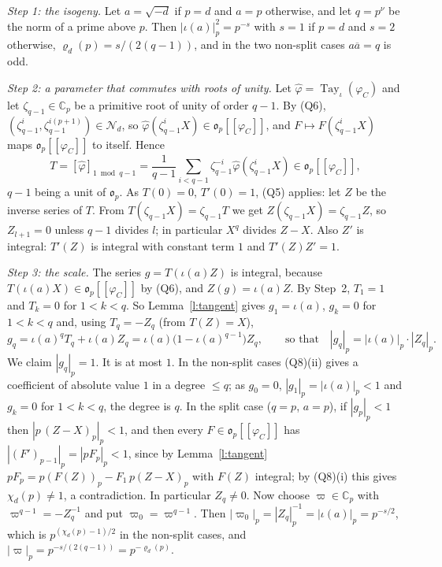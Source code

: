 \documentclass[11pt,a4paper]{article}
\makeatletter
\theoremstyle{plainx}
\theoremstyle{uprightx}
\renewenvironment{proof}[1][Proof]{\par\pushQED{\qed}\normalfont\topsep0pt\partopsep0pt
  \trivlist\item[\hskip\labelsep\itshape #1.]\ignorespaces}{\popQED\endtrivlist\@endpefalse}
\newcommand{\CC}{\mathbb{C}}
\newcommand{\Cp}{\CC_p}
\newcommand{\op}{\mathfrak{o}_p}
\newcommand{\np}[1]{|#1|_p}
\newcommand{\cj}[1]{\overline{#1}}
\newcommand{\chid}[1]{\chi_{#1}}
\newcommand{\nsw}[2]{\varrho_{#1}(#2)}
\newcommand{\phC}[1]{\varphi_{#1}}
\newcommand{\tayj}[1]{\operatorname{Tay}_\iota(#1)}
\newcommand{\phiring}[1]{\op[[\phC{#1}]]}
\newcommand{\cpart}[3]{[#3]_{#2\bmod #1}}
\makeatother
\begin{document}
\begin{proof}
\emph{Step 1: the isogeny.} Let $a=\sqrt{-d}$ if $p=d$ and $a=p$ otherwise, and let $q=p^\nu$ be the norm of a
prime above $p$. Then $\np{\iota(a)}^2=p^{-s}$ with $s=1$ if $p=d$ and $s=2$ otherwise, $\nsw{d}{p}=s/(2(q-1))$, and
in the two non-split cases $a\cj a=q$ is odd.

\emph{Step 2: a parameter that commutes with roots of unity.} Let $\hat\varphi=\tayj{\phC{C}}$ and let
$\zeta_{q-1}\in\Cp$ be a primitive root of unity of order $q-1$. By (Q6), $(\zeta_{q-1}^i,\zeta_{q-1}^{i(p+1)})\in\mathcal{N}_d$, so
$\hat\varphi(\zeta_{q-1}^iX)\in\phiring{C}$, and $F\mapsto F(\zeta_{q-1}^iX)$ maps $\phiring{C}$ to itself. Hence
\[T=\cpart{q-1}{1}{\hat\varphi}=\frac1{q-1}\sum_{i<q-1}\zeta_{q-1}^{-i}\hat\varphi(\zeta_{q-1}^iX)\in\phiring{C} ,\]
$q-1$ being a unit of $\op$. As $T(0)=0$, $T'(0)=1$, (Q5) applies: let $Z$ be the inverse series of $T$. From
$T(\zeta_{q-1} X)=\zeta_{q-1} T$ we get $Z(\zeta_{q-1} X)=\zeta_{q-1} Z$, so $Z_{l+1}=0$ unless $q-1$ divides $l$; in particular $X^q$
divides $Z-X$. Also $Z'$ is integral: $T'(Z)$ is integral with constant term $1$ and $T'(Z)Z'=1$.

\emph{Step 3: the scale.} The series
$g=T(\iota(a)Z)$ is integral, because $T(\iota(a)X)\in\phiring{C}$ by (Q6), and $Z(g)=\iota(a)Z$. By Step~2, $T_1=1$ and
$T_k=0$ for $1<k<q$. So Lemma~\ref{l:tangent} gives $g_1=\iota(a)$, $g_k=0$ for $1<k<q$ and, using $T_q=-Z_q$
(from $T(Z)=X$),
\[g_q=\iota(a)^qT_q+\iota(a)Z_q=\iota(a)\bigl(1-\iota(a)^{q-1}\bigr)Z_q,\qquad\text{so that}\quad\np{g_q}=\np{\iota(a)}\cdot\np{Z_q} .\]
We claim $\np{g_q}=1$. It is at most $1$. In the non-split cases (Q8)(ii) gives a coefficient of absolute value
$1$ in a degree $\le q$; as $g_0=0$, $\np{g_1}=\np{\iota(a)}<1$ and $g_k=0$ for $1<k<q$, the degree is $q$. In the
split case ($q=p$, $a=p$), if $\np{g_p}<1$ then
$\np{p\,(Z-X)_p}<1$, and then every $F\in\phiring{C}$ has $\np{(F')_{p-1}}=\np{pF_p}<1$, since by
Lemma~\ref{l:tangent} $pF_p=p(F(Z))_p-F_1\,p(Z-X)_p$ with $F(Z)$ integral; by (Q8)(i) this gives $\chid{d}(p)\ne1$, a
contradiction. In particular $Z_q\ne0$. Now choose $\varpi\in\Cp$ with $\varpi^{q-1}=-Z_q^{-1}$ and put
$\varpi_0=\varpi^{q-1}$. Then $\np{\varpi_0}=\np{Z_q}^{-1}=\np{\iota(a)}=p^{-s/2}$, which is $p^{(\chid{d}(p)-1)/2}$ in
the non-split cases, and
$\np{\varpi}=p^{-s/(2(q-1))}=p^{-\nsw{d}{p}}$.


\end{proof}
\end{document}
